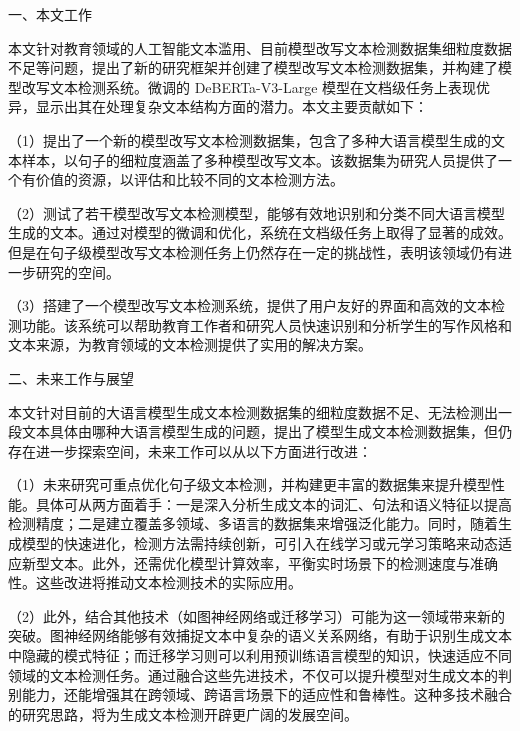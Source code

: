%
%
%
%

\begin{conclusion}

一、本文工作

本文针对教育领域的人工智能文本滥用、目前模型改写文本检测数据集细粒度数据不足等问题，提出了新的研究框架并创建了模型改写文本检测数据集，并构建了模型改写文本检测系统。微调的 DeBERTa-V3-Large 模型在文档级任务上表现优异，显示出其在处理复杂文本结构方面的潜力。本文主要贡献如下：

（1）提出了一个新的模型改写文本检测数据集，包含了多种大语言模型生成的文本样本，以句子的细粒度涵盖了多种模型改写文本。该数据集为研究人员提供了一个有价值的资源，以评估和比较不同的文本检测方法。

（2）测试了若干模型改写文本检测模型，能够有效地识别和分类不同大语言模型生成的文本。通过对模型的微调和优化，系统在文档级任务上取得了显著的成效。但是在句子级模型改写文本检测任务上仍然存在一定的挑战性，表明该领域仍有进一步研究的空间。

（3）搭建了一个模型改写文本检测系统，提供了用户友好的界面和高效的文本检测功能。该系统可以帮助教育工作者和研究人员快速识别和分析学生的写作风格和文本来源，为教育领域的文本检测提供了实用的解决方案。

二、未来工作与展望

本文针对目前的大语言模型生成文本检测数据集的细粒度数据不足、无法检测出一段文本具体由哪种大语言模型生成的问题，提出了模型生成文本检测数据集，但仍存在进一步探索空间，未来工作可以从以下方面进行改进：

（1）未来研究可重点优化句子级文本检测，并构建更丰富的数据集来提升模型性能。具体可从两方面着手：一是深入分析生成文本的词汇、句法和语义特征以提高检测精度；二是建立覆盖多领域、多语言的数据集来增强泛化能力。同时，随着生成模型的快速进化，检测方法需持续创新，可引入在线学习或元学习策略来动态适应新型文本。此外，还需优化模型计算效率，平衡实时场景下的检测速度与准确性。这些改进将推动文本检测技术的实际应用。

（2）此外，结合其他技术（如图神经网络或迁移学习）可能为这一领域带来新的突破。图神经网络能够有效捕捉文本中复杂的语义关系网络，有助于识别生成文本中隐藏的模式特征；而迁移学习则可以利用预训练语言模型的知识，快速适应不同领域的文本检测任务。通过融合这些先进技术，不仅可以提升模型对生成文本的判别能力，还能增强其在跨领域、跨语言场景下的适应性和鲁棒性。这种多技术融合的研究思路，将为生成文本检测开辟更广阔的发展空间。


\end{conclusion}
